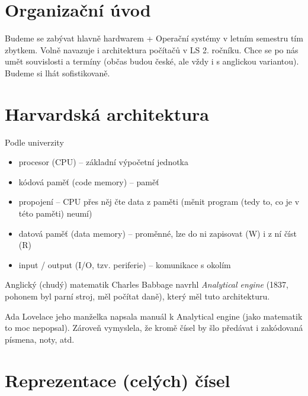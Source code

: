 \documentclass[12pt]{article}					%
\begin{document}
\section{Organizační úvod}
    Budeme se zabývat hlavně hardwarem + Operační systémy v letním semestru tím zbytkem. Volně navazuje i architektura počítačů v LS 2. ročníku. Chce se po nás umět souvislosti a termíny (občas budou české, ale vždy i s anglickou variantou). Budeme si lhát sofistikovaně.

\section{Harvardská architektura}
    Podle univerzity
    \begin{itemize}
        \item procesor (CPU) -- základní výpočetní jednotka
        \item kódová paměť (code memory) -- paměť
        \item propojení -- CPU přes něj čte data z paměti (měnit program (tedy to, co je v této paměti) neumí)
        \item datová paměť (data memory) -- proměnné, lze do ni zapisovat (W) i z ní číst (R)
        \item input / output (I/O, tzv. periferie) -- komunikace s okolím
    \end{itemize}
    Anglický (chudý) matematik Charles Babbage navrhl \emph{Analytical engine} (1837, pohonem byl parní stroj, měl počítat daně), který měl tuto architekturu.
    
    Ada Lovelace jeho manželka napsala manuál k Analytical engine (jako matematik to moc nepopsal). Zároveň vymyslela, že kromě čísel by šlo předávat i zakódovaná písmena, noty, atd.
    
\section{Reprezentace (celých) čísel}
\end{document}
